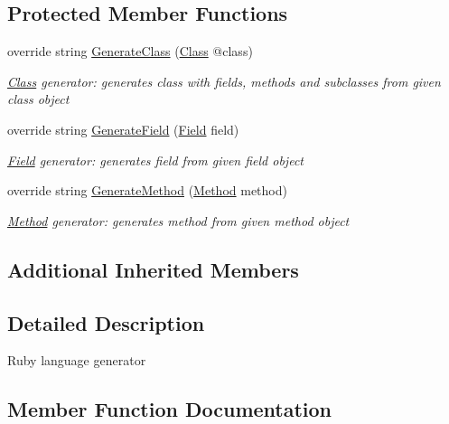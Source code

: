 \subsection*{Protected Member Functions}
\begin{DoxyCompactItemize}
\item 
override string \mbox{\hyperlink{classCodeGen_1_1generators_1_1RubyGenerator_a5d54d68890f2fc6c58e297f79647c033}{Generate\+Class}} (\mbox{\hyperlink{classCodeGen_1_1generators_1_1Class}{Class}} @class)
\begin{DoxyCompactList}\small\item\em \mbox{\hyperlink{classCodeGen_1_1generators_1_1Class}{Class}} generator\+: generates class with fields, methods and subclasses from given class object  \end{DoxyCompactList}\item 
override string \mbox{\hyperlink{classCodeGen_1_1generators_1_1RubyGenerator_a08fbd6d88c129901aa159e3a9a706278}{Generate\+Field}} (\mbox{\hyperlink{classCodeGen_1_1generators_1_1Field}{Field}} field)
\begin{DoxyCompactList}\small\item\em \mbox{\hyperlink{classCodeGen_1_1generators_1_1Field}{Field}} generator\+: generates field from given field object  \end{DoxyCompactList}\item 
override string \mbox{\hyperlink{classCodeGen_1_1generators_1_1RubyGenerator_aa37c187dae8e400b050dcddba10d216b}{Generate\+Method}} (\mbox{\hyperlink{classCodeGen_1_1generators_1_1Method}{Method}} method)
\begin{DoxyCompactList}\small\item\em \mbox{\hyperlink{classCodeGen_1_1generators_1_1Method}{Method}} generator\+: generates method from given method object  \end{DoxyCompactList}\end{DoxyCompactItemize}
\subsection*{Additional Inherited Members}


\subsection{Detailed Description}
Ruby language generator 



\subsection{Member Function Documentation}
\mbox{\label{classCodeGen_1_1generators_1_1RubyGenerator_a5d54d68890f2fc6c58e297f79647c033}} 
